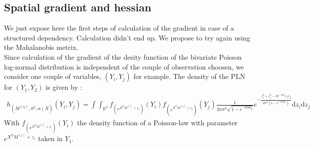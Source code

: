 \documentclass[11pt, a4paper]{article}
\begin{document}
\subsection{Spatial gradient and hessian} \label{spatial}
We just expose here the first steps of calculation of the gradient in case of a structured dependency. Calculation didn't end up. We propose to try again using the Mahalanobis metrix.\\
Since calculation of the gradient of the desity function of the bivariate Poisson log-normal distribution is independent of the couple of observation choosen, we consider one couple of variables, $(Y_i,Y_j)$ for example. The density of the PLN for $(Y_1,Y_2)$ is given by :
\begin{align*}
h_{(M^{(ij)},\sigma^2,\alpha \mid X)}(Y_i,Y_j) = \int \int _{\mathbb{R}^2} f_{(e^{X^T M^{(i)} + z_i})}(Y_i) f_{(e^{X^T M^{(j)} + z_j})}(Y_j) \frac{1}{2 \pi \sigma^2 \sqrt{1-e^{-2 \alpha d_{ij}}}} e^{- \frac{z_i^2+z_j^2-2 e^{- \alpha d_{ij}} z_i z_j}{2 \sigma^2 (1- e^{-2 \alpha d_{ij}})}} \mathrm{d}z_i \mathrm{d} z_j
\end{align*}
With $f_{(e^{X^T M^{(i)} + z_i})}(Y_i)$ the density function of a Poisson-law with parameter $e^{X^T M^{(i)} + z_i}$ taken in $Y_1$.\\
\\
\end{document}
